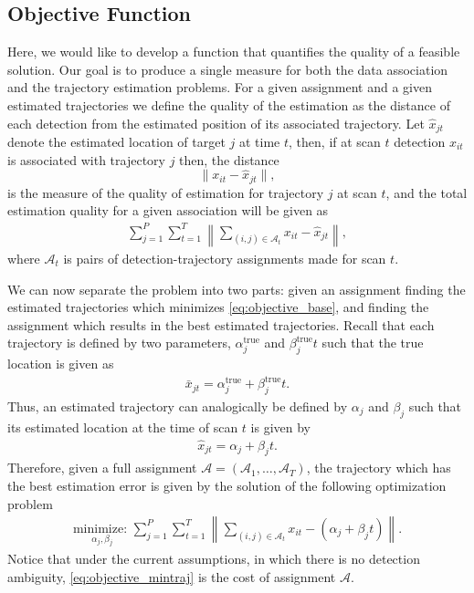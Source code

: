 \subsection{Objective Function}
Here, we would like to develop a function that quantifies the quality of a feasible solution. Our goal is to produce a single measure for both the data association and the trajectory estimation problems. For a given assignment and a given estimated trajectories we define the quality of the estimation as the distance of each detection from the estimated position of its associated trajectory. Let $\hat{x}_{jt}$ denote the estimated location of target $j$ at time $t$, then, if at scan $t$ detection $x_{it}$ is associated with trajectory $j$ then, the distance 
$$\|x_{it}-\hat{x}_{jt}\|,$$
is the measure of the quality of estimation for trajectory $j$ at scan $t$, and the total estimation quality for a given association will be given as 
\begin{align}\label{eq:objective_base}
\sum_{j=1}^P\sum_{t=1}^T\left\|\sum_{(i,j)\in \mathcal{A}_{t}} x_{it} - \hat{x}_{jt}\right\|,
\end{align} 
where $\mathcal{A}_t$ is pairs of detection-trajectory assignments made for scan $t$. 

We can now separate the problem into two parts: given an assignment finding the estimated trajectories which minimizes \eqref{eq:objective_base}, and finding the assignment which results in the best estimated trajectories. Recall that each trajectory is defined by two parameters, $\alpha^{\text{true}}_{j}$ and $\beta^{\text{true}}_{j}t$ such that the true location is given as 
\begin{align*}
	\bar{x}_{jt} = \alpha^{\text{true}}_{j} + \beta^{\text{true}}_{j}t.
\end{align*}
Thus, an estimated trajectory can analogically be defined by  $\alpha_{j}$ and $\beta_{j}$ such that its estimated location at the time of scan $t$ is given by
\begin{align*}
	\hat{x}_{jt} =  \alpha_{j} + \beta_{j}t.
\end{align*}
Therefore, given a full assignment  $\mathcal{A}=(\mathcal{A}_1,\ldots,\mathcal{A}_T)$, the trajectory which has the best estimation error is given by the solution of the following optimization problem
\begin{align}\label{eq:objective_mintraj}
\underset{\alpha_{j}, \beta_{j}}{\text{minimize: }}\sum_{j=1}^P\sum_{t=1}^T\left\|\sum_{(i,j)\in \mathcal{A}_{t}} x_{it} - (\alpha_{j} + \beta_{j}t)\right\|.
\end{align} 
Notice that under the current assumptions, in which there is no detection ambiguity, \eqref{eq:objective_mintraj} is the cost of assignment $\mathcal{A}$. 

